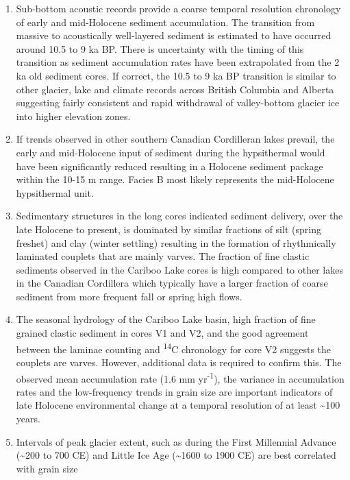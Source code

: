 \documentclass[
  letterpaper,
  DIV=11,
  numbers=noendperiod]{scrartcl}
\providecommand{\tightlist}{%
  \setlength{\itemsep}{0pt}\setlength{\parskip}{0pt}}\usepackage{longtable,booktabs,array}
\begin{document}
\begin{enumerate}
\def\labelenumi{\arabic{enumi}.}
\tightlist
\item
  Sub-bottom acoustic records provide a coarse temporal resolution
  chronology of early and mid-Holocene sediment accumulation. The
  transition from massive to acoustically well-layered sediment is
  estimated to have occurred around 10.5 to 9 ka BP. There is
  uncertainty with the timing of this transition as sediment
  accumulation rates have been extrapolated from the 2 ka old sediment
  cores. If correct, the 10.5 to 9 ka BP transition is similar to other
  glacier, lake and climate records across British Columbia and Alberta
  suggesting fairly consistent and rapid withdrawal of valley-bottom
  glacier ice into higher elevation zones.
\item
  If trends observed in other southern Canadian Cordilleran lakes
  prevail, the early and mid-Holocene input of sediment during the
  hypsithermal would have been significantly reduced resulting in a
  Holocene sediment package within the 10-15 m range. Facies B most
  likely represents the mid-Holocene hypsithermal unit.
\item
  Sedimentary structures in the long cores indicated sediment delivery,
  over the late Holocene to present, is dominated by similar fractions
  of silt (spring freshet) and clay (winter settling) resulting in the
  formation of rhythmically laminated couplets that are mainly varves.
  The fraction of fine clastic sediments observed in the Cariboo Lake
  cores is high compared to other lakes in the Canadian Cordillera which
  typically have a larger fraction of coarse sediment from more frequent
  fall or spring high flows.
\item
  The seasonal hydrology of the Cariboo Lake basin, high fraction of
  fine grained clastic sediment in cores V1 and V2, and the good
  agreement between the laminae counting and \textsuperscript{14}C
  chronology for core V2 suggests the couplets are varves. However,
  additional data is required to confirm this. The observed mean
  accumulation rate (1.6 mm yr\textsuperscript{-1}), the variance in
  accumulation rates and the low-frequency trends in grain size are
  important indicators of late Holocene environmental change at a
  temporal resolution of at least \textasciitilde100 years.
\item
  Intervals of peak glacier extent, such as during the First Millennial
  Advance (\textasciitilde200 to 700 CE) and Little Ice Age
  (\textasciitilde1600 to 1900 CE) are best correlated with grain size

\end{enumerate}
\end{document}
